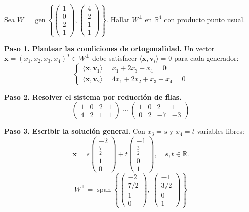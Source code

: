 \begin{example}
Sea $W = \operatorname{gen} \left\{ \begin{pmatrix} 1 \\ 0 \\ 2 \\ 1 \end{pmatrix}, \begin{pmatrix} 4 \\ 2 \\ 1 \\ 1 \end{pmatrix} \right\}$. Hallar $W^\perp$ en $\mathbb{R}^4$ con producto punto usual.
\begin{myproof}
\textbf{Paso 1. Plantear las condiciones de ortogonalidad.} Un vector $\mathbf{x} = (x_1, x_2, x_3, x_4)^T \in W^\perp$ debe satisfacer $\langle \mathbf{x}, \mathbf{v}_i \rangle = 0$ para cada generador:
\[
\begin{cases}
\langle \mathbf{x}, \mathbf{v}_1 \rangle = x_1 + 2x_3 + x_4 = 0 \\
\langle \mathbf{x}, \mathbf{v}_2 \rangle = 4x_1 + 2x_2 + x_3 + x_4 = 0
\end{cases}
\]

\textbf{Paso 2. Resolver el sistema por reducción de filas.}
\[
\begin{pmatrix}
1 & 0 & 2 & 1 \\
4 & 2 & 1 & 1
\end{pmatrix}
\sim
\begin{pmatrix}
1 & 0 & 2 & 1 \\
0 & 2 & -7 & -3
\end{pmatrix}
\]

\textbf{Paso 3. Escribir la solución general.} Con $x_3 = s$ y $x_4 = t$ variables libres:
\[
\mathbf{x} = s \begin{pmatrix} -2 \\ \frac{7}{2} \\ 1 \\ 0 \end{pmatrix} + t \begin{pmatrix} -1 \\ \frac{3}{2} \\ 0 \\ 1 \end{pmatrix}, \quad s,t \in \mathbb{R}.
\]
$$\boxed{W^\perp = \operatorname{span}\!\left\{ \begin{pmatrix} -2 \\ 7/2 \\ 1 \\ 0 \end{pmatrix},\ \begin{pmatrix} -1 \\ 3/2 \\ 0 \\ 1 \end{pmatrix} \right\}}$$
\end{myproof}
\end{example}

